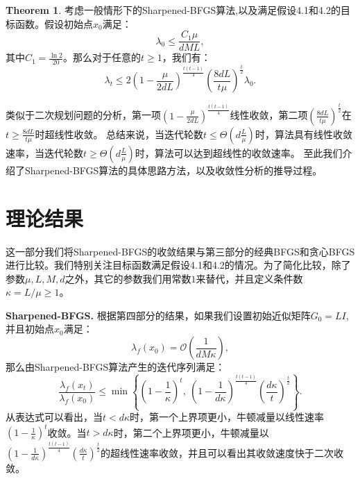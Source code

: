 \documentclass[a4paper,twoside,AutoFakeBold]{article}
\theoremstyle{definition}
\newtheorem{thrm2}{{Theorem}}
\begin{document}
\begin{thrm2}
    考虑一般情形下的Sharpened-BFGS算法,以及满足假设4.1和4.2的目标函数。假设初始点$x_0$满足：
    \begin{equation}
        \lambda_0 \leq \frac{C_1\mu}{dML},
    \end{equation}
    其中$ C_1 = \frac{\ln{2}}{20}$。那么对于任意的$t\ge 1$，我们有：
    \begin{equation}
        \lambda_t \leq 2\left(1 - \frac{\mu}{2dL}\right)^{\frac{t(t - 1)}{4}} \left(\frac{8dL}{t\mu}\right)^{\frac{t}{2}}\lambda_0.
    \end{equation}
\end{thrm2}

类似于二次规划问题的分析，第一项$\left(1 - \frac{\mu}{2dL}\right)^{\frac{t(t - 1)}{4}}$线性收敛，第二项$\left(\frac{8dL}{t\mu}\right)^{\frac{t}{2}}$在$t\ge\frac{8dL}{t\mu}$时超线性收敛。
总结来说，当迭代轮数$t \leq \Theta(d\frac{L}{\mu})$时，算法具有线性收敛速率，当迭代轮数$t \geq \Theta(d\frac{L}{\mu})$时，算法可以达到超线性的收敛速率。
至此我们介绍了Sharpened-BFGS算法的具体思路方法，以及收敛性分析的推导过程。

%
\section{理论结果}\label{section:theory}
这一部分我们将Sharpened-BFGS的收敛结果与第三部分的经典BFGS和贪心BFGS进行比较。我们特别关注目标函数满足假设4.1和4.2的情况。为了简化比较，除了参数$\mu,L,M,d$之外，其它的参数我们用常数$1$来替代，并且定义条件数$\kappa = {L}/{\mu} \geq 1$。

\noindent \textbf{Sharpened-BFGS.}
根据第四部分的结果，如果我们设置初始近似矩阵$G_0=LI$,并且初始点$x_0$满足：
\begin{equation*}
    \lambda_f(x_0) = \mathcal{O}\left(\frac{1}{dM\kappa}\right),
\end{equation*}
那么由Sharpened-BFGS算法产生的迭代序列满足：
\begin{equation*}
    \frac{\lambda_f(x_t)}{\lambda_f(x_0)} \leq
    \min\left\{\left(1 \!-\! \frac{1}{\kappa}\right)^t ,\  \left(1 \!-\! \frac{1}{d\kappa}\right)^{\!\frac{t(t - 1)}{4}}\!\! \left(\frac{d\kappa}{t}\right)^{\frac{t}{2}} \right\}.
\end{equation*}
从表达式可以看出，当$t<d\kappa$时，第一个上界项更小，牛顿减量以线性速率$\left(1 \!-\! \frac{1}{\kappa}\right)^t$收敛。当$t>d\kappa$时，第二个上界项更小，牛顿减量以$\left(1 \!-\! \frac{1}{d\kappa}\right)^{\!\frac{t(t - 1)}{4}}\!\! \left(\frac{d\kappa}{t}\right)^{\frac{t}{2}}$的超线性速率收敛，并且可以看出其收敛速度快于二次收敛。
\end{document}

